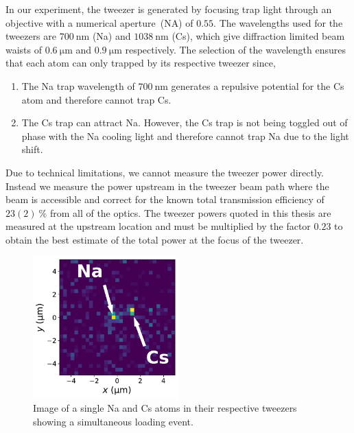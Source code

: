 In our experiment, the tweezer is generated by focusing trap light
through an objective with a numerical aperture~(NA) of $0.55$.
The wavelengths used for the tweezers are $700~\mathrm{nm}$ (Na) and $1038~\mathrm{nm}$ (Cs),
which give diffraction limited beam waists of
$0.6~\mathrm{\mu m}$ and $0.9~\mathrm{\mu m}$ respectively.
The selection of the wavelength ensures that each atom can only trapped
by its respective tweezer since,
\begin{enumerate}
\item The Na trap wavelength of $700~\mathrm{nm}$ generates a repulsive potential
  for the Cs atom and therefore cannot trap Cs.
\item The Cs trap can attract Na. However, the Cs trap is not being toggled
  out of phase with the Na cooling light and therefore cannot trap Na due to the light shift.
\end{enumerate}
Due to technical limitations, we cannot measure the tweezer power directly.
Instead we measure the power upstream in the tweezer beam path where the beam is accessible
and correct for the known total transmission efficiency of $23(2)~\mathrm{\%}$
from all of the optics.
The tweezer powers quoted in this thesis are measured at the upstream location
and must be multiplied by the factor $0.23$ to obtain
the best estimate of the total power at the focus of the tweezer.

\begin{figure}
  \centering
  \includegraphics[width=0.5\textwidth]{figures/loading_single_atoms.pdf}
  \caption[Image of single Na and Cs atoms.]{
    Image of a single Na and Cs atoms in their respective tweezers
    showing a simultaneous loading event.
    \label{fig:loading:loading:single-atoms}}
\end{figure}

